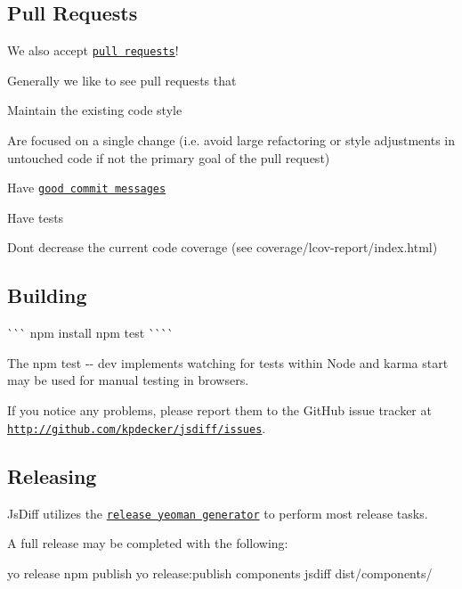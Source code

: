 \subsection*{Pull Requests}

We also accept \href{https://github.com/kpdecker/jsdiff/pull/new/master}{\tt pull requests}!

Generally we like to see pull requests that
\begin{DoxyItemize}
\item Maintain the existing code style
\item Are focused on a single change (i.\+e. avoid large refactoring or style adjustments in untouched code if not the primary goal of the pull request)
\item Have \href{http://tbaggery.com/2008/04/19/a-note-about-git-commit-messages.html}{\tt good commit messages}
\item Have tests
\item Don\textquotesingle{}t decrease the current code coverage (see coverage/lcov-\/report/index.\+html)
\end{DoxyItemize}

\subsection*{Building}

\`{}\`{}\`{} npm install npm test \`{}\`{}\`{}\`{}

The {\ttfamily npm test -\/-\/ dev} implements watching for tests within Node and {\ttfamily karma start} may be used for manual testing in browsers.

If you notice any problems, please report them to the Git\+Hub issue tracker at \href{http://github.com/kpdecker/jsdiff/issues}{\tt http\+://github.\+com/kpdecker/jsdiff/issues}.

\subsection*{Releasing}

Js\+Diff utilizes the \href{https://github.com/walmartlabs/generator-release}{\tt release yeoman generator} to perform most release tasks.

A full release may be completed with the following\+:


\begin{DoxyCode}
yo release
npm publish
yo release:publish components jsdiff dist/components/
\end{DoxyCode}
 